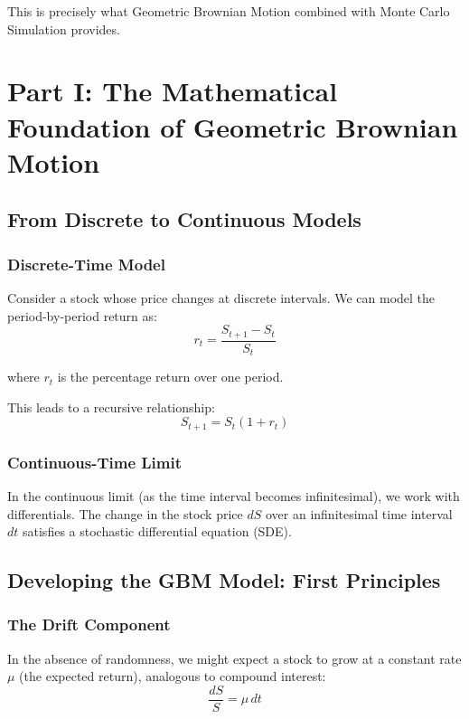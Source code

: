 \documentclass[12pt,a4paper]{article}
\begin{document}
This is precisely what Geometric Brownian Motion combined with Monte Carlo Simulation provides.

\newpage

\section{Part I: The Mathematical Foundation of Geometric Brownian Motion}

\subsection{From Discrete to Continuous Models}

\subsubsection{Discrete-Time Model}

Consider a stock whose price changes at discrete intervals. We can model the period-by-period return as:
\begin{equation}
r_t = \frac{S_{t+1} - S_t}{S_t}
\end{equation}

where $r_t$ is the percentage return over one period.

This leads to a recursive relationship:
\begin{equation}
S_{t+1} = S_t(1 + r_t)
\end{equation}

\subsubsection{Continuous-Time Limit}

In the continuous limit (as the time interval becomes infinitesimal), we work with differentials. The change in the stock price $dS$ over an infinitesimal time interval $dt$ satisfies a stochastic differential equation (SDE).

\subsection{Developing the GBM Model: First Principles}

\subsubsection{The Drift Component}

In the absence of randomness, we might expect a stock to grow at a constant rate $\mu$ (the expected return), analogous to compound interest:
\begin{equation}
\frac{dS}{S} = \mu \, dt
\end{equation}
\end{document}
